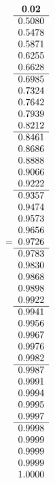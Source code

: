 =\hbox{$\begin{array}{c}
\bf 0.02 
 \\ \hline 
  0.5080 \\ 
  0.5478 \\ 
  0.5871 \\ 
  0.6255 \\ 
  0.6628
 \\ \hline 
  0.6985 \\ 
  0.7324 \\ 
  0.7642 \\ 
  0.7939 \\ 
  0.8212
 \\ \hline 
  0.8461 \\ 
  0.8686 \\ 
  0.8888 \\ 
  0.9066 \\ 
  0.9222
 \\ \hline 
  0.9357 \\ 
  0.9474 \\ 
  0.9573 \\ 
  0.9656 \\ 
  0.9726
 \\ \hline 
  0.9783 \\ 
  0.9830 \\ 
  0.9868 \\ 
  0.9898 \\ 
  0.9922
 \\ \hline 
  0.9941 \\ 
  0.9956 \\ 
  0.9967 \\ 
  0.9976 \\ 
  0.9982
 \\ \hline 
  0.9987 \\ 
  0.9991 \\ 
  0.9994 \\ 
  0.9995 \\ 
  0.9997
 \\ \hline 
  0.9998 \\ 
  0.9999 \\ 
  0.9999 \\ 
  0.9999 \\ 
  1.0000
 \end{array}$}

